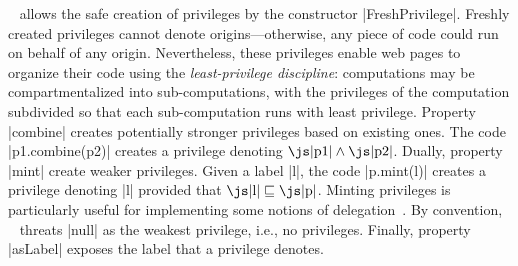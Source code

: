 \sys~ allows the safe creation of privileges by the constructor
\js|FreshPrivilege|. Freshly created privileges cannot denote
origins---otherwise, any piece of code could run on behalf of any origin.
Nevertheless, these privileges enable web pages to organize their code using the
\emph{least-privilege discipline}: computations may be compartmentalized into
sub-computations, with the privileges of the computation subdivided so that each
sub-computation runs with least privilege. Property \js|combine| creates
potentially stronger privileges based on existing ones. The code 
\js|p1.combine(p2)| creates a privilege denoting $\mbox{\js|p1|} \land
\mbox{\js|p2|}$.  Dually, property \js|mint| create weaker privileges. Given a
label \js|l|, the code \js|p.mint(l)| creates a privilege denoting \js|l| provided that
$\mbox{\js|l|} \sqsubseteq \mbox{\js|p|}$. Minting privileges is particularly
useful for implementing some notions of delegation~\cite{stefan:2011:dclabels}.  By convention,
\sys~ threats \js|null| as the weakest privilege, i.e., no privileges. Finally,
property \js|asLabel| exposes the label that a privilege denotes. 










